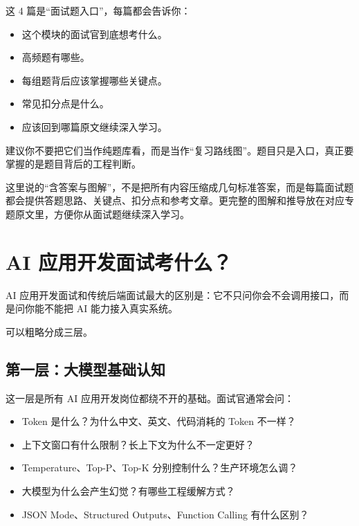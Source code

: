 \documentclass[9pt,a4paper,twocolumn]{ctexart}
\begin{document}
这 4 篇是“面试题入口”，每篇都会告诉你：


\begin{itemize}[itemsep=1pt, topsep=2pt]
  \item 这个模块的面试官到底想考什么。
  \item 高频题有哪些。
  \item 每组题背后应该掌握哪些关键点。
  \item 常见扣分点是什么。
  \item 应该回到哪篇原文继续深入学习。
\end{itemize}


建议你不要把它们当作纯题库看，而是当作“复习路线图”。题目只是入口，真正要掌握的是题目背后的工程判断。



这里说的“含答案与图解”，不是把所有内容压缩成几句标准答案，而是每篇面试题都会提供答题思路、关键点、扣分点和参考文章。更完整的图解和推导放在对应专题原文里，方便你从面试题继续深入学习。



\section*{AI 应用开发面试考什么？}


AI 应用开发面试和传统后端面试最大的区别是：它不只问你会不会调用接口，而是问你能不能把 AI 能力接入真实系统。



可以粗略分成三层。



\subsection*{第一层：大模型基础认知}


这一层是所有 AI 应用开发岗位都绕不开的基础。面试官通常会问：


\begin{itemize}[itemsep=1pt, topsep=2pt]
  \item Token 是什么？为什么中文、英文、代码消耗的 Token 不一样？
  \item 上下文窗口有什么限制？长上下文为什么不一定更好？
  \item Temperature、Top-P、Top-K 分别控制什么？生产环境怎么调？
  \item 大模型为什么会产生幻觉？有哪些工程缓解方式？
  \item JSON Mode、Structured Outputs、Function Calling 有什么区别？
\end{itemize}
\end{document}
